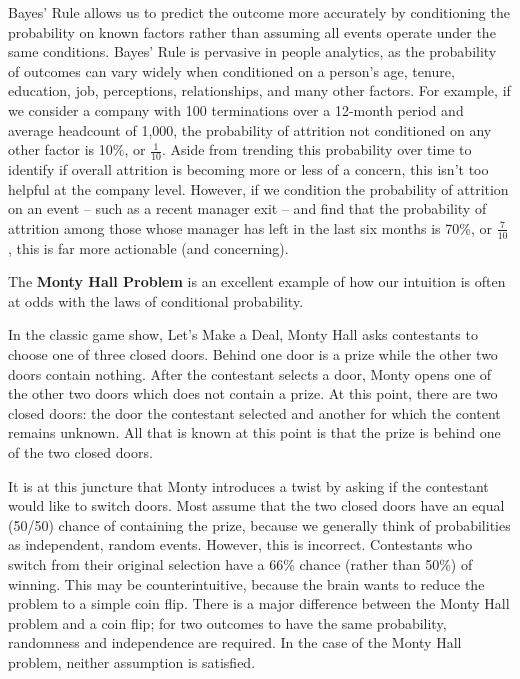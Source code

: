 \documentclass[]{book}
\begin{document}
Bayes' Rule allows us to predict the outcome more accurately by conditioning the probability on known factors rather than assuming all events operate under the same conditions. Bayes' Rule is pervasive in people analytics, as the probability of outcomes can vary widely when conditioned on a person's age, tenure, education, job, perceptions, relationships, and many other factors. For example, if we consider a company with 100 terminations over a 12-month period and average headcount of 1,000, the probability of attrition not conditioned on any other factor is 10\%, or \(\frac{1}{10}\). Aside from trending this probability over time to identify if overall attrition is becoming more or less of a concern, this isn't too helpful at the company level. However, if we condition the probability of attrition on an event -- such as a recent manager exit -- and find that the probability of attrition among those whose manager has left in the last six months is 70\%, or \(\frac{7}{10}\), this is far more actionable (and concerning).

The \textbf{Monty Hall Problem} is an excellent example of how our intuition is often at odds with the laws of conditional probability.

In the classic game show, Let's Make a Deal, Monty Hall asks contestants to choose one of three closed doors. Behind one door is a prize while the other two doors contain nothing. After the contestant selects a door, Monty opens one of the other two doors which does not contain a prize. At this point, there are two closed doors: the door the contestant selected and another for which the content remains unknown. All that is known at this point is that the prize is behind one of the two closed doors.

It is at this juncture that Monty introduces a twist by asking if the contestant would like to switch doors. Most assume that the two closed doors have an equal (50/50) chance of containing the prize, because we generally think of probabilities as independent, random events. However, this is incorrect. Contestants who switch from their original selection have a 66\% chance (rather than 50\%) of winning. This may be counterintuitive, because the brain wants to reduce the problem to a simple coin flip. There is a major difference between the Monty Hall problem and a coin flip; for two outcomes to have the same probability, randomness and independence are required. In the case of the Monty Hall problem, neither assumption is satisfied.
\end{document}
